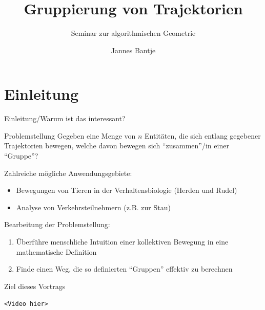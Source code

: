 \documentclass[
wide,
10pt,
xcolor={x11names,svgnames},
hyperref={pdfauthor={Jannes Bantje},colorlinks,urlcolor=maincolor,hidelinks=false,linkcolor=maincolor},
pantone312, 	%
euler-digits,
]{beamer}
\theoremstyle{definition}
\begin{document}
\makeatletter
\author{Jannes Bantje} \let\Author\@author
\title{Gruppierung von Trajektorien}
\subtitle{Seminar zur algorithmischen Geometrie}
\makeatother


\begin{frame}[plain]
  \maketitle
\end{frame}

\section{Einleitung}
\begin{frame}{Einleitung/Warum ist das interessant?}
    \begin{block}{Problemstellung}
        Gegeben eine Menge von $n$ Entitäten, die sich entlang gegebener Trajektorien bewegen, welche davon bewegen sich \enquote{zusammen}/in einer \enquote{Gruppe}?
    \end{block}
    Zahlreiche mögliche Anwendungsgebiete:
    \begin{itemize}
        \item Bewegungen von Tieren in der Verhaltensbiologie (Herden und Rudel)
        \item Analyse von Verkehrsteilnehmern (z.B. zur Stau)
    \end{itemize}
    Bearbeitung der Problemstellung:
    \begin{enumerate}
        \item Überführe menschliche Intuition einer kollektiven Bewegung in eine mathematische Definition
        \item Finde einen Weg, die so definierten \enquote{Gruppen} effektiv zu berechnen
    \end{enumerate}
\end{frame}

\begin{frame}{Ziel dieses Vortrags}
    \begin{center}
        \texttt{<Video hier>}
    \end{center}
\end{frame}
\end{document}

